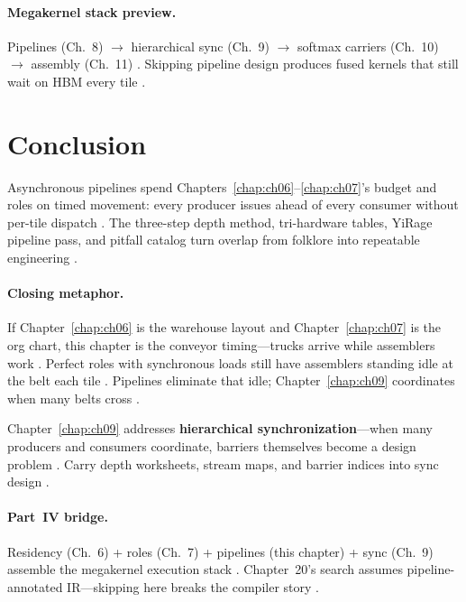 \paragraph{Megakernel stack preview.}
Pipelines (Ch.~8) $\rightarrow$ hierarchical sync (Ch.~9) $\rightarrow$ softmax carriers (Ch.~10) $\rightarrow$ assembly (Ch.~11) \citep{dao2022flashattention,semianalysis2024tma,shah2024flashattention3,mpk2025,patel2025llminference}.
Skipping pipeline design produces fused kernels that still wait on HBM every tile \citep{memoryfloor2026,taxbreak2026,yirage2026}.

\section{Conclusion}
\label{sec:ch08_conclusion}

Asynchronous pipelines spend Chapters~\ref{chap:ch06}--\ref{chap:ch07}'s budget and roles on timed movement: every producer issues ahead of every consumer without per-tile dispatch \citep{shah2024flashattention3,yirage2026,semianalysis2024tma,dao2022flashattention}.
The three-step depth method, tri-hardware tables, YiRage pipeline pass, and pitfall catalog turn overlap from folklore into repeatable engineering \citep{patel2025llminference,chen2020compilerbasedhardw,taxbreak2026,mpk2025}.

\paragraph{Closing metaphor.}
If Chapter~\ref{chap:ch06} is the warehouse layout and Chapter~\ref{chap:ch07} is the org chart, this chapter is the conveyor timing---trucks arrive while assemblers work \citep{dao2022flashattention,yirage2026,shah2024flashattention3}.
Perfect roles with synchronous loads still have assemblers standing idle at the belt each tile \citep{memoryfloor2026,taxbreak2026}.
Pipelines eliminate that idle; Chapter~\ref{chap:ch09} coordinates when many belts cross \citep{semianalysis2024tma,patel2025llminference}.

Chapter~\ref{chap:ch09} addresses \textbf{hierarchical synchronization}---when many producers and consumers coordinate, barriers themselves become a design problem \citep{taxbreak2026,patel2025llminference,shah2024flashattention3}.
Carry depth worksheets, stream maps, and barrier indices into sync design \citep{yirage2026,semianalysis2024tma,chen2020compilerbasedhardw}.

\paragraph{Part~IV bridge.}
Residency (Ch.~6) + roles (Ch.~7) + pipelines (this chapter) + sync (Ch.~9) assemble the megakernel execution stack \citep{dao2022flashattention,shah2024flashattention3,mpk2025}.
Chapter~20's search assumes pipeline-annotated IR---skipping here breaks the compiler story \citep{wu2024mirage,yirage2026,chen2020compilerbasedhardw}.

